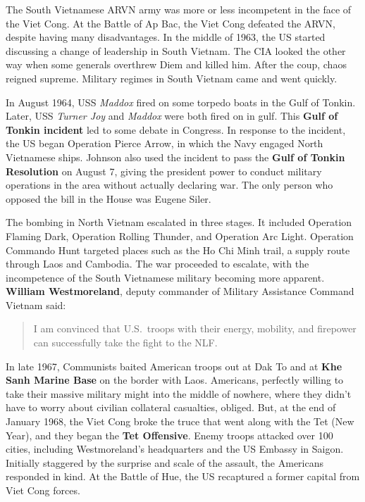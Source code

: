 The South Vietnamese ARVN army was more or less incompetent in the face of the Viet Cong.
At the Battle of Ap Bac, the Viet Cong defeated the ARVN, despite having many disadvantages.
In the middle of 1963, the US started discussing a change of leadership in South Vietnam.
The CIA looked the other way when some generals overthrew Diem and killed him.
After the coup, chaos reigned supreme.
Military regimes in South Vietnam came and went quickly.

In August 1964, USS \textit{Maddox} fired on some torpedo boats in the Gulf of Tonkin.
Later, USS \textit{Turner Joy} and \textit{Maddox} were both fired on in gulf.
This \textbf{Gulf of Tonkin incident} led to some debate in Congress.
In response to the incident, the US began Operation Pierce Arrow, in which the Navy engaged North Vietnamese ships.
Johnson also used the incident to pass the \textbf{Gulf of Tonkin Resolution} on August 7,
giving the president power to conduct military operations in the area without actually declaring war.
The only person who opposed the bill in the House was Eugene Siler.

The bombing in North Vietnam escalated in three stages.
It included Operation Flaming Dark, Operation Rolling Thunder, and Operation Arc Light.
Operation Commando Hunt targeted places such as the Ho Chi Minh trail, a supply route through Laos and Cambodia.
The war proceeded to escalate, with the incompetence of the South Vietnamese military becoming more apparent.
\textbf{William Westmoreland}, deputy commander of Military Assistance Command Vietnam said:
\begin{quote}
  I am convinced that U.S.\ troops with their energy, mobility, and firepower
  can successfully take the fight to the NLF\@.
\end{quote}

In late 1967, Communists baited American troops out at Dak To
and at \textbf{Khe Sanh Marine Base} on the border with Laos.
Americans, perfectly willing to take their massive military might into the middle of nowhere,
where they didn't have to worry about civilian collateral casualties, obliged.
But, at the end of January 1968, the Viet Cong broke the truce that went along with the Tet (New Year),
and they began the \textbf{Tet Offensive}.
Enemy troops attacked over 100 cities, including Westmoreland's headquarters and the US Embassy in Saigon.
Initially staggered by the surprise and scale of the assault, the Americans responded in kind.
At the Battle of Hue, the US recaptured a former capital from Viet Cong forces.

